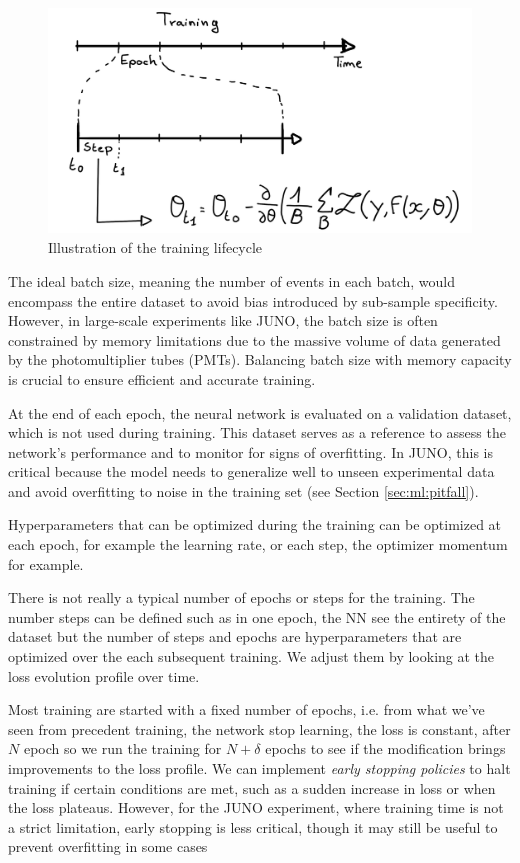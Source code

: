 \documentclass[../main.tex]{subfiles}
\begin{document}
\begin{figure}[ht]
  \centering
  \includegraphics[height=6cm]{images/ml/lifecycle.jpg}
  \caption{Illustration of the training lifecycle}
  \label{fig:ml:lifecycle}
\end{figure}

The ideal batch size, meaning the number of events in each batch, would encompass the entire dataset to avoid bias introduced by sub-sample specificity. However, in large-scale experiments like JUNO, the batch size is often constrained by memory limitations due to the massive volume of data generated by the photomultiplier tubes (PMTs). Balancing batch size with memory capacity is crucial to ensure efficient and accurate training.

At the end of each epoch, the neural network is evaluated on a validation dataset, which is not used during training. This dataset serves as a reference to assess the network's performance and to monitor for signs of overfitting. In JUNO, this is critical because the model needs to generalize well to unseen experimental data and avoid overfitting to noise in the training set (see Section \ref{sec:ml:pitfall}).

Hyperparameters that can be optimized during the training can be optimized at each epoch, for example the learning rate, or each step, the optimizer momentum for example.

There is not really a typical number of epochs or steps for the training. The number steps can be defined such as in one epoch, the NN see the entirety of the dataset but the number of steps and epochs are hyperparameters that are optimized over the each subsequent training. We adjust them by looking at the loss evolution profile over time.

Most training are started with a fixed number of epochs, i.e. from what we've seen from precedent training, the network stop learning, the loss is constant, after $N$ epoch so we run the training for $N+\delta$ epochs to see if the modification brings improvements to the loss profile.
We can implement \textit{early stopping policies} to halt training if certain conditions are met, such as a sudden increase in loss or when the loss plateaus. However, for the JUNO experiment, where training time is not a strict limitation, early stopping is less critical, though it may still be useful to prevent overfitting in some cases
\end{document}
